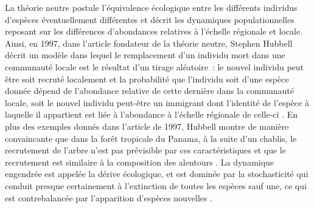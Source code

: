 La théorie neutre postule l'équivalence écologique entre les différents
individus d'espèces éventuellement différentes et décrit les dynamiques
populationnelles reposant sur les différences d'abondances relatives à
l'échelle régionale et locale. Ainsi, en 1997, dans l'article fondateur
de la théorie neutre, Stephen Hubbell décrit un modèle dans lequel le
remplacement d'un individu mort dans une communauté locale est le
résultat d'un tirage aléatoire~: le nouvel individu peut être soit
recruté localement et la probabilité que l'individu soit d'une espèce
donnée dépend de l'abondance relative de cette dernière dans la
communauté locale, soit le nouvel individu peut-être un immigrant dont
l'identité de l'espèce à laquelle il appartient est liée à l'abondance à
l'échelle régionale de celle-ci \citep{Hubbell1997}. En plus des
exemples donnés dans l'article de 1997, Hubbell montre de manière
convaincante que dans la forêt tropicale du Panama, à la suite d'un
chablis, le recrutement de l'arbre n'est pas prévisible par ces
caractéristiques et que le recrutement est similaire à la composition
des alentours \citep{Hubbell1999}. La dynamique engendrée est appelée la
dérive écologique, et est dominée par la stochasticité qui conduit
presque certainement à l'extinction de toutes les espèces sauf une, ce
qui est contrebalancée par l'apparition d'espèces nouvelles
\citep{Hubbell2010, Ricklefs2003}.

